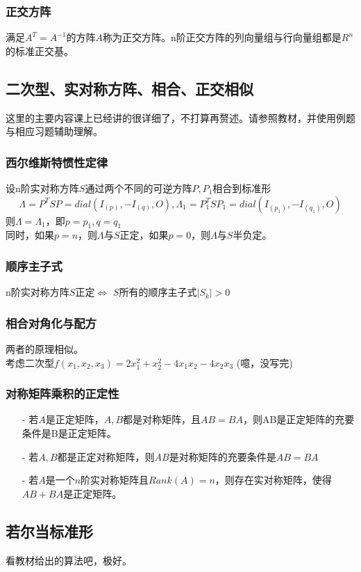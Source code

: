 \documentclass[UTF8]{ctexart}
\begin{document}
\subsubsection{正交方阵}
满足$A^{T}=A^{-1}$的方阵$A$称为正交方阵。n阶正交方阵的列向量组与行向量组都是$R^{n}$的标准正交基。
\subsection{二次型、实对称方阵、相合、正交相似}
这里的主要内容课上已经讲的很详细了，不打算再赘述。请参照教材，并使用例题与相应习题辅助理解。
\subsubsection{西尔维斯特惯性定律}
设n阶实对称方阵$S$通过两个不同的可逆方阵$P,P_{1}$相合到标准形
\[\Lambda=P^{T}SP=dial(I_{(p)},-I_{(q)},\mathit{O}),\Lambda_{1}=P_{1}^{T}SP_{1}=dial(I_{(p_1)},-I_{(q_1)},\mathit{O}) \]
则$\Lambda=\Lambda_{1}$，即$p=p_1,q=q_1$\\
\indent
同时，如果$p=n$，则$\Lambda$与$S$正定，如果$p=0$，则$\Lambda$与$S$半负定。
\subsubsection{顺序主子式}
n阶实对称方阵$S$正定$\Leftrightarrow$ $S$所有的顺序主子式$|S_k|>0$
\subsubsection{相合对角化与配方}
两者的原理相似。\\
\indent
考虑二次型$f(x_{1},x_{2},x_{3})=2x_{1}^{2}+x_{2}^{2}-4x_{1}x_{2}-4x_{2}x_{3}$
(噫，没写完)
\subsubsection{对称矩阵乘积的正定性}
\begin{itemize}
    \item [-]若$A$是正定矩阵，$A,B$都是对称矩阵，且$AB=BA$，则AB是正定矩阵的充要条件是B是正定矩阵。
    \item [-]若$A,B$都是正定对称矩阵，则$AB$是对称矩阵的充要条件是$AB=BA$
    \item [-]若$A$是一个$n$阶实对称矩阵且$Rank(A)=n$，则存在实对称矩阵，使得$AB+BA$是正定矩阵。
\end{itemize}
\subsection{若尔当标准形}
看教材给出的算法吧，极好。
\end{document}
